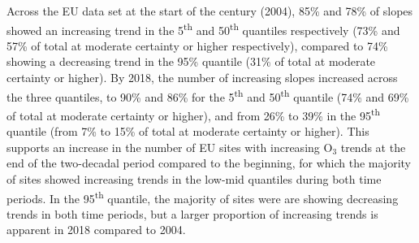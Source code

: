 \documentclass[journal abbreviation, manuscript]{copernicus}
\begin{document}



Across the EU data set at the start of the century (2004), 85\% and 78\% of slopes showed an increasing trend in the 5\textsuperscript{th} and 50\textsuperscript{th} quantiles respectively (73\% and 57\% of total at moderate certainty or higher respectively), compared to 74\% showing a decreasing trend in the 95\% quantile (31\% of total at moderate certainty or higher). By 2018, the number of increasing slopes increased across the three quantiles, to 90\% and 86\% for the 5\textsuperscript{th} and 50\textsuperscript{th} quantile (74\% and 69\% of total at moderate certainty or higher), and from 26\% to 39\% in the 95\textsuperscript{th} quantile (from 7\% to 15\% of total at moderate certainty or higher). This supports an increase in the number of EU sites with increasing O$_3$ trends at the end of the two-decadal period compared to the beginning, for which the majority of sites showed increasing trends in the low-mid quantiles during both time periods. In the 95\textsuperscript{th} quantile, the majority of sites were are showing decreasing trends in both time periods, but a larger proportion of increasing trends is apparent in 2018 compared to 2004. 
\end{document}
